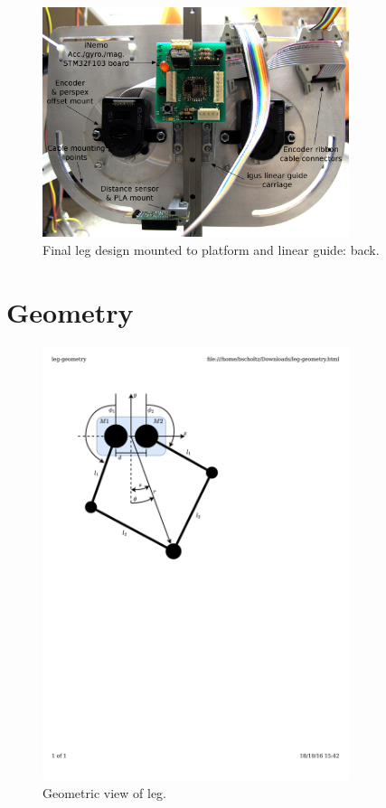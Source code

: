 \begin{figure}
\centering
\includegraphics[width=0.8\textwidth]{images/mechanical/encoder-mount-annotated} 
\caption{Final leg design mounted to platform and linear guide: back.}
\label{fig:Final leg design - back}
\end{figure}

\section{Geometry}

\begin{figure}
\centering
\includegraphics[clip, trim=2cm 15cm 7cm 2cm, page = 1, width=0.8\textwidth]{images/geometry/leg-geometry} 
\caption{Geometric view of leg.}
\label{fig:Geometric view of leg}
\end{figure}

